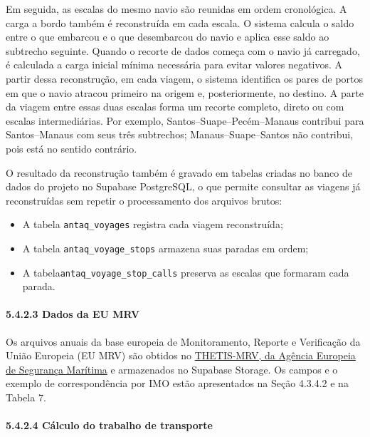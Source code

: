 \documentclass[brazil,]{article}
\providecommand{\tightlist}{%
  \setlength{\itemsep}{0pt}\setlength{\parskip}{0pt}}
\let\oldparagraph\paragraph
\renewcommand{\paragraph}[1]{\Needspace{7\baselineskip}\oldparagraph{#1}\mbox{}}
\begin{document}
Em seguida, as escalas do mesmo navio são reunidas em ordem cronológica.
A carga a bordo também é reconstruída em cada escala. O sistema calcula
o saldo entre o que embarcou e o que desembarcou do navio e aplica esse
saldo ao subtrecho seguinte. Quando o recorte de dados começa com o
navio já carregado, é calculada a carga inicial mínima necessária para
evitar valores negativos. A partir dessa reconstrução, em cada viagem, o
sistema identifica os pares de portos em que o navio atracou primeiro na
origem e, posteriormente, no destino. A parte da viagem entre essas duas
escalas forma um recorte completo, direto ou com escalas intermediárias.
Por exemplo, Santos--Suape--Pecém--Manaus contribui para Santos--Manaus
com seus três subtrechos; Manaus--Suape--Santos não contribui, pois está
no sentido contrário.

O resultado da reconstrução também é gravado em tabelas criadas no banco
de dados do projeto no Supabase PostgreSQL, o que permite consultar as
viagens já reconstruídas sem repetir o processamento dos arquivos
brutos:

\begin{itemize}
\tightlist
\item
  A tabela \texttt{antaq\_voyages} registra cada viagem reconstruída;
\item
  A tabela \texttt{antaq\_voyage\_stops} armazena suas paradas em ordem;
\item
  A tabela\texttt{antaq\_voyage\_stop\_calls} preserva as escalas que
  formaram cada parada.
\end{itemize}

\hypertarget{dados-da-eu-mrv}{%
\paragraph{5.4.2.3 Dados da EU MRV}\label{dados-da-eu-mrv}}

Os arquivos anuais da base europeia de Monitoramento, Reporte e
Verificação da União Europeia (EU MRV) são obtidos no
\href{https://mrv.emsa.europa.eu/}{THETIS-MRV, da Agência Europeia de
Segurança Marítima} e armazenados no Supabase Storage. Os campos e o
exemplo de correspondência por IMO estão apresentados na Seção 4.3.4.2 e
na Tabela 7.

\hypertarget{cuxe1lculo-do-trabalho-de-transporte}{%
\paragraph{5.4.2.4 Cálculo do trabalho de
transporte}\label{cuxe1lculo-do-trabalho-de-transporte}}
\end{document}
